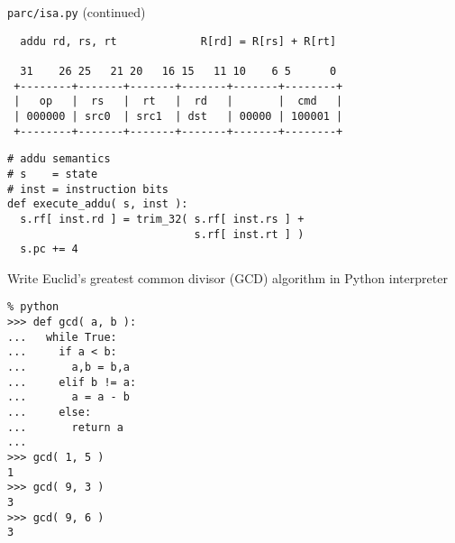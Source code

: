 \begin{frame}[fragile]{\texttt{parc/isa.py} (continued)}

\begin{verbatim}
  addu rd, rs, rt             R[rd] = R[rs] + R[rt]

  31    26 25   21 20   16 15   11 10    6 5      0
 +--------+-------+-------+-------+-------+--------+
 |   op   |  rs   |  rt   |  rd   |       |  cmd   |
 | 000000 | src0  | src1  | dst   | 00000 | 100001 |
 +--------+-------+-------+-------+-------+--------+

\end{verbatim}

\vspace{-40pt}

\begin{lstlisting}
# addu semantics
# s    = state
# inst = instruction bits
def execute_addu( s, inst ):
  s.rf[ inst.rd ] = trim_32( s.rf[ inst.rs ] +
                             s.rf[ inst.rt ] )
  s.pc += 4
\end{lstlisting}
\end{frame}


\begin{task}
\begin{frame}[fragile]{Write Euclid's greatest common divisor (GCD)
algorithm in Python interpreter}

\vspace{-30pt}

\begin{lstlisting}
% python
>>> def gcd( a, b ):
...   while True:
...     if a < b:
...       a,b = b,a
...     elif b != a:
...       a = a - b
...     else:
...       return a
...
>>> gcd( 1, 5 )
1
>>> gcd( 9, 3 )
3
>>> gcd( 9, 6 )
3
\end{lstlisting}

\end{frame}
\end{task}


